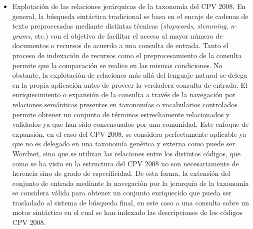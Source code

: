 \begin{itemize}
\item Explotación de las relaciones jerárquicas de la taxonomía del CPV 2008. En general, la búsqueda sintáctica 
tradicional se basa en el encaje de cadenas de texto preprocesadas mediante distintas técnicas (\textit{stopwords}, 
\textit{stemming}, \textit{n-grams}, etc.) con el objetivo de facilitar el acceso al mayor número de documentos 
o recursos de acuerdo a una consulta de entrada. Tanto el proceso de indexación de recursos como el preprocesamiento 
de la consulta permite que la comparación se realice en las mismas condiciones. No obstante, la explotación de relaciones 
más allá del lenguaje natural se delega en la propia aplicación antes de proveer la verdadera consulta de entrada. El enriquecimiento 
o expansión de la consulta a través de la navegación por relaciones semánticas presentes en taxonomías o vocabularios 
controlados permite obtener un conjunto de términos estrechamente relacionados y validados ya que han sido consensuados 
por una comunidad. Este enfoque de expansión, en el caso del CPV 2008, se considera perfectamente aplicable ya que no 
es delegado en una taxonomía genérica y externa como puede ser Wordnet, sino que se utilizan las relaciones 
entre los distintos códigos, que como se ha visto en la estructura del CPV 2008 no son necesariamente de 
herencia sino de grado de especificidad. De esta forma, la extensión del conjunto de entrada mediante la navegación 
por la jerarquía de la taxonomía se considera válida para obtener un conjunto enriquecido que pueda ser 
trasladado al sistema de búsqueda final, en este caso a una consulta sobre un motor sintáctico 
en el cual se han indexado las descripciones de los códigos CPV 2008.


\end{itemize}
